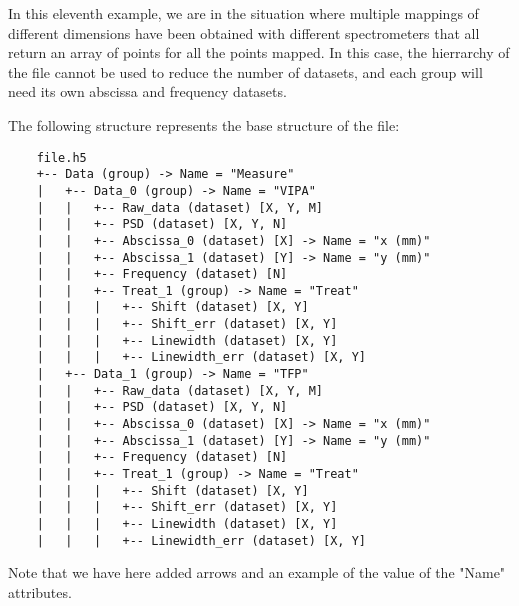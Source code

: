 In this eleventh example, we are in the situation where multiple mappings of different dimensions have been obtained with different spectrometers that all return an array of points for all the points mapped. In this case, the hierrarchy of the file cannot be used to reduce the number of datasets, and each group will need its own abscissa and frequency datasets.

The following structure represents the base structure of the file:
\begin{verbatim}
    file.h5
    +-- Data (group) -> Name = "Measure"
    |   +-- Data_0 (group) -> Name = "VIPA"
    |   |   +-- Raw_data (dataset) [X, Y, M]
    |   |   +-- PSD (dataset) [X, Y, N]
    |   |   +-- Abscissa_0 (dataset) [X] -> Name = "x (mm)"
    |   |   +-- Abscissa_1 (dataset) [Y] -> Name = "y (mm)"
    |   |   +-- Frequency (dataset) [N]
    |   |   +-- Treat_1 (group) -> Name = "Treat"
    |   |   |   +-- Shift (dataset) [X, Y]
    |   |   |   +-- Shift_err (dataset) [X, Y]
    |   |   |   +-- Linewidth (dataset) [X, Y]
    |   |   |   +-- Linewidth_err (dataset) [X, Y]
    |   +-- Data_1 (group) -> Name = "TFP"
    |   |   +-- Raw_data (dataset) [X, Y, M]
    |   |   +-- PSD (dataset) [X, Y, N]
    |   |   +-- Abscissa_0 (dataset) [X] -> Name = "x (mm)"
    |   |   +-- Abscissa_1 (dataset) [Y] -> Name = "y (mm)"
    |   |   +-- Frequency (dataset) [N]
    |   |   +-- Treat_1 (group) -> Name = "Treat"
    |   |   |   +-- Shift (dataset) [X, Y]
    |   |   |   +-- Shift_err (dataset) [X, Y]
    |   |   |   +-- Linewidth (dataset) [X, Y]
    |   |   |   +-- Linewidth_err (dataset) [X, Y]
\end{verbatim}
Note that we have here added arrows and an example of the value of the "Name" attributes.